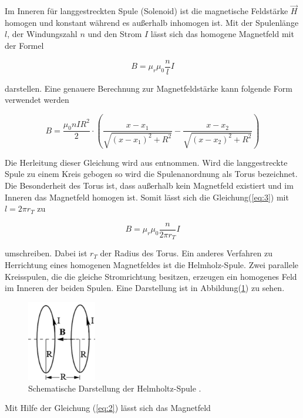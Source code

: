 Im Inneren für langgestreckten Spule (Solenoid) ist die magnetische Feldstärke $\vec{H}$
homogen und konstant während es außerhalb inhomogen ist.
Mit der Spulenlänge $l$, der Windungszahl $n$ und den Strom $I$ lässt sich das
homogene Magnetfeld mit der Formel

\begin{equation}
  B = \mu_r \mu_0 \frac{n}{l} I
  \label{eq:3}
\end{equation}

darstellen.
Eine genauere Berechnung zur Magnetfeldstärke kann folgende Form verwendet werden

\begin{equation}
  B= \frac{\mu_0 n I R^2}{2} \cdot (\frac{x-x_1}{\sqrt{(x-x_1)^2 +R^2}} - \frac{x-x_2}{\sqrt{(x-x_2)^2 +R^2}})
  \label{eq:7}
\end{equation}

Die Herleitung dieser Gleichung wird aus \cite{2} entnommen.
Wird die langgestreckte Spule zu einem Kreis gebogen so wird die Spulenanordnung
als Torus bezeichnet. Die Besonderheit des Torus ist, dass außerhalb kein Magnetfeld
existiert und im Inneren das Magnetfeld homogen ist. Somit lässt sich die Gleichung(\ref{eq:3})
mit $l= 2\pi r_T$ zu

\begin{equation}
  B = \mu_r \mu_0 \frac{n}{2\pi r_T} I
  \label{eq:4}
\end{equation}

umschreiben. Dabei ist $r_T$ der Radius des Torus.
Ein anderes Verfahren zu Herrichtung eines homogenen Magnetfeldes ist die Helmholz-Spule.
Zwei parallele Kreisspulen, die die gleiche Stromrichtung besitzen, erzeugen ein homogenes
Feld im Inneren der beiden Spulen. Eine Darstellung ist in Abbildung(\ref{abb:2}) zu sehen.

\begin{figure}[H]
  \centering
\includegraphics[width =5 cm, height = 3.5cm]{Abb2.png}
\caption{Schematische Darstellung der Helmholtz-Spule \cite{1}.}
\label{abb:2}
\end{figure}

Mit Hilfe der Gleichung (\ref{eq:2}) lässt sich das Magnetfeld


